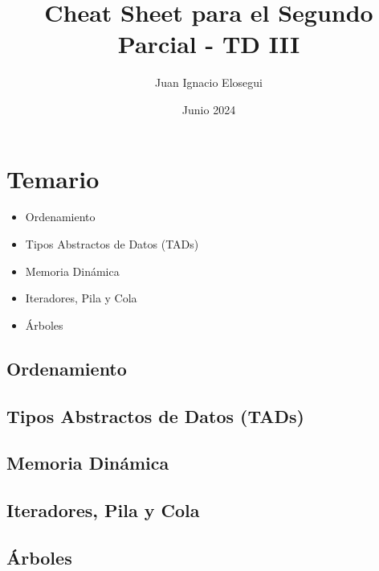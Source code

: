 \documentclass[12pt]{article}
\begin{document}
	\title{Cheat Sheet para el Segundo Parcial - TD III}
	\author{Juan Ignacio Elosegui}
	\date{Junio 2024}
	\maketitle
	
	\section*{Temario}
		\begin{itemize}
			\item Ordenamiento
			\item Tipos Abstractos de Datos (TADs)
			\item Memoria Dinámica
			\item Iteradores, Pila y Cola
			\item Árboles
		\end{itemize}	  
		
		\newpage
		
		\subsection*{Ordenamiento}
			\newpage
			
		\subsection*{Tipos Abstractos de Datos (TADs)}
			\newpage
			
		\subsection*{Memoria Dinámica}
			\newpage
			
		\subsection*{Iteradores, Pila y Cola}
			\newpage
			
		\subsection*{Árboles}
			\newpage
	
\end{document}
